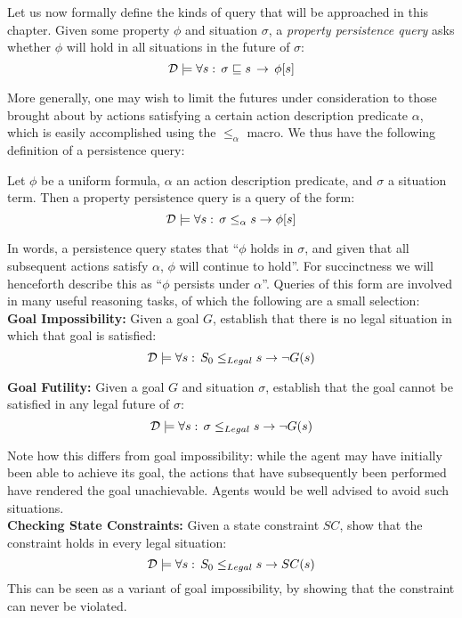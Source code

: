 Let us now formally define the kinds of query that will be approached
in this chapter. Given some property $\phi$ and situation $\sigma$,
a \emph{property persistence query} asks whether $\phi$ will hold
in all situations in the future of $\sigma$: \[
\mathcal{D}\models\forall s:\,\sigma\sqsubseteq s\,\rightarrow\,\phi[s]\]


More generally, one may wish to limit the futures under consideration
to those brought about by actions satisfying a certain action description
predicate $\alpha$, which is easily accomplished using the $\leq_{\alpha}$
macro. We thus have the following definition of a persistence query:

\begin{defnL}
 Let $\phi$ be a uniform
formula, $\alpha$ an action description predicate, and $\sigma$
a situation term. Then a property persistence query is a query of
the form:\[
\mathcal{D}\models\forall s:\,\sigma\le_{\alpha}s\rightarrow\phi[s]\]

\end{defnL}
In words, a persistence query states that {}``$\phi$ holds in $\sigma$,
and given that all subsequent actions satisfy $\alpha$, $\phi$ will
continue to hold''. For succinctness we will henceforth describe
this as {}``$\phi$ persists under $\alpha$''. Queries of this
form are involved in many useful reasoning tasks, of which the following
are a small selection:\\


\textbf{Goal Impossibility:} Given a goal $G$, establish that there
is no legal situation in which that goal is satisfied:\[
\mathcal{D}\models\forall s:\, S_{0}\leq_{Legal}s\rightarrow\neg G(s)\]


\textbf{Goal Futility:} Given a goal $G$ and situation $\sigma$,
establish that the goal cannot be satisfied in any legal future of
$\sigma$:\[
\mathcal{D}\models\forall s:\,\sigma\leq_{Legal}s\rightarrow\neg G(s)\]


Note how this differs from goal impossibility: while the agent may
have initially been able to achieve its goal, the actions that have
subsequently been performed have rendered the goal unachievable. Agents
would be well advised to avoid such situations.\\


\textbf{Checking State Constraints:} Given a state constraint $SC$,
show that the constraint holds in every legal situation:\[
\mathcal{D}\models\forall s:\, S_{0}\leq_{Legal}s\rightarrow SC(s)\]
 This can be seen as a variant of goal impossibility, by showing that
the constraint can never be violated.\\


